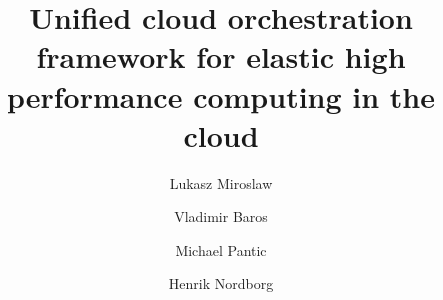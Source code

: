 \documentclass[3p,times]{elsarticle}
\begin{document}
\begin{frontmatter}




\title{Unified cloud orchestration framework for elastic high performance computing in the cloud}


\author[hsr]{Lukasz Miroslaw}
\author[hsr]{Vladimir Baros}
\author[hsr]{Michael Pantic}
\author[hsr]{Henrik Nordborg}

\address[hsr]{Institute for Energy Technology, Hochschule Rapperswil, Switzerland}
\address[eth]{ETH Zurich, Switzerland}

\begin{abstract}


\end{abstract}
\end{frontmatter}
\end{document}
